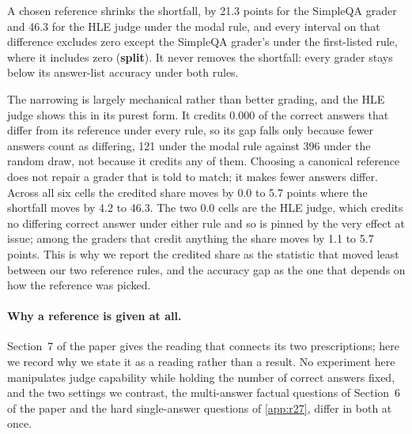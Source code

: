 
\noindent A chosen reference shrinks the shortfall, by 21.3 points for the SimpleQA grader and 46.3 for the
HLE judge under the modal rule, and every interval on that difference excludes zero except the SimpleQA
grader's under the first-listed rule, where it includes zero (\textbf{split}). It never removes the
shortfall: every grader stays below its answer-list accuracy under both rules.

The narrowing is largely mechanical rather than better grading, and the HLE judge shows this in its purest
form. It credits 0.000 of the correct answers that differ from its reference under every rule, so its gap
falls only because fewer answers count as differing, 121 under the modal rule against 396 under the random
draw, not because it credits any of them. Choosing a canonical reference does not repair a grader that is
told to match; it makes fewer answers differ. Across all six cells the credited share moves by 0.0 to 5.7
points where the shortfall moves by 4.2 to 46.3. The two 0.0 cells are the HLE judge, which credits no
differing correct answer under either rule and so is pinned by the very effect at issue; among the graders
that credit anything the share moves by 1.1 to 5.7 points. This is why we report the
credited share as the statistic that moved least between our two reference rules, and the accuracy gap as
the one that depends on how the reference was picked.

\paragraph{Why a reference is given at all.}
Section~7 of the paper gives the reading that connects its two prescriptions; here we record why we state it
as a reading rather than a result. No experiment here manipulates judge capability while holding the number
of correct answers fixed, and the two settings we contrast, the multi-answer factual questions of
Section~6 of the paper and the hard single-answer questions of \cref{app:r27}, differ in both at once.

\FloatBarrier
